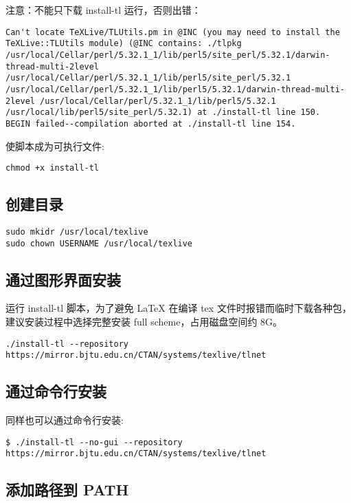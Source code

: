 注意：不能只下载 install-tl 运行，否则出错：
\begin{verbatim}
Can't locate TeXLive/TLUtils.pm in @INC (you may need to install the TeXLive::TLUtils module) (@INC contains: ./tlpkg /usr/local/Cellar/perl/5.32.1_1/lib/perl5/site_perl/5.32.1/darwin-thread-multi-2level /usr/local/Cellar/perl/5.32.1_1/lib/perl5/site_perl/5.32.1 /usr/local/Cellar/perl/5.32.1_1/lib/perl5/5.32.1/darwin-thread-multi-2level /usr/local/Cellar/perl/5.32.1_1/lib/perl5/5.32.1 /usr/local/lib/perl5/site_perl/5.32.1) at ./install-tl line 150.
BEGIN failed--compilation aborted at ./install-tl line 154.
\end{verbatim}

使脚本成为可执行文件:

\begin{verbatim}
chmod +x install-tl
\end{verbatim}

\subsection{创建目录}

\begin{verbatim}
sudo mkidr /usr/local/texlive
sudo chown USERNAME /usr/local/texlive
\end{verbatim}

\subsection{通过图形界面安装}

运行 install-tl 脚本，为了避免 {\LaTeX} 在编译 tex 文件时报错而临时下载各种包，
建议安装过程中选择完整安装 full scheme，占用磁盘空间约 8G。

\begin{verbatim}
./install-tl --repository https://mirror.bjtu.edu.cn/CTAN/systems/texlive/tlnet
\end{verbatim}

\subsection{通过命令行安装 }

同样也可以通过命令行安装:

\begin{verbatim}
$ ./install-tl --no-gui --repository https://mirror.bjtu.edu.cn/CTAN/systems/texlive/tlnet
\end{verbatim}

\subsection{添加路径到 PATH}

